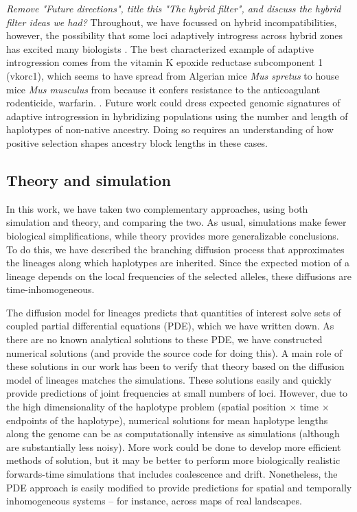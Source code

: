 \documentclass[11pt,letterpaper]{article}
\newcommand{\plr}[1]{{\em \color{blue} #1}}
\begin{document}
\plr{Remove "Future directions", title this "The hybrid filter", and discuss the hybrid filter ideas we had?}
Throughout, we have focussed on hybrid incompatibilities, however, the possibility that some loci adaptively introgress across hybrid zones has excited many biologists \citep{Arnold2004}.   
The best characterized example of adaptive introgression comes from the vitamin K epoxide reductase subcomponent 1 (vkorc1), which seems to have spread from Algerian mice \emph{Mus spretus} to house mice \emph{Mus musculus} from because it confers resistance to the anticoagulant rodenticide, warfarin. \citep{Song2011}. 
Future work could dress expected genomic signatures of adaptive introgression in hybridizing populations using the number and length of haplotypes of non-native ancestry. 
Doing so requires an understanding of how positive selection shapes ancestry block lengths in these cases. 



\subsection*{Theory and simulation}
In this work, we have taken two complementary approaches,
using both simulation and theory, and comparing the two.
As usual, simulations make fewer biological simplifications,
while theory provides more generalizable conclusions.
To do this, we have described the branching diffusion process that approximates
the lineages along which haplotypes are inherited.
Since the expected motion of a lineage depends on the local frequencies of the selected alleles,
these diffusions are time-inhomogeneous.

The diffusion model for lineages predicts that quantities of interest solve sets of coupled partial differential equations (PDE),
which we have written down.
As there are no known analytical solutions to these PDE,
we have constructed numerical solutions (and provide the source code for doing this).
A main role of these solutions in our work has been to verify that theory based on the diffusion model of lineages
matches the simulations.
These solutions easily and quickly provide predictions of joint frequencies at small numbers of loci.
However, due to the high dimensionality of the haplotype problem (spatial position $\times$ time $\times$ endpoints of the haplotype),
numerical solutions for mean haplotype lengths along the genome can be as computationally intensive as simulations
(although are substantially less noisy).
More work could be done to develop more efficient methods of solution,
but it may be better to perform more biologically realistic forwards-time simulations that includes coalescence and drift.
Nonetheless, the PDE approach is easily modified to provide predictions for spatial and temporally inhomogeneous systems --
for instance, across maps of real landscapes.
\end{document}
